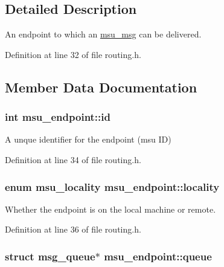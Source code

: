 \subsection{Detailed Description}
An endpoint to which an \hyperlink{structmsu__msg}{msu\-\_\-msg} can be delivered. 

Definition at line 32 of file routing.\-h.



\subsection{Member Data Documentation}
\hypertarget{structmsu__endpoint_ac80e655dbd6368c00945caf7de8e5a4b}{
\subsubsection[{id}]{\setlength{\rightskip}{0pt plus 5cm}int msu\-\_\-endpoint\-::id}}\label{structmsu__endpoint_ac80e655dbd6368c00945caf7de8e5a4b}


A unque identifier for the endpoint (msu I\-D) 



Definition at line 34 of file routing.\-h.

\hypertarget{structmsu__endpoint_aa06a2a0cc4c7ba40109635371acc8249}{
\subsubsection[{locality}]{\setlength{\rightskip}{0pt plus 5cm}enum {\bf msu\-\_\-locality} msu\-\_\-endpoint\-::locality}}\label{structmsu__endpoint_aa06a2a0cc4c7ba40109635371acc8249}


Whether the endpoint is on the local machine or remote. 



Definition at line 36 of file routing.\-h.

\hypertarget{structmsu__endpoint_af1f7b343c89039de19431c0e620916b3}{
\subsubsection[{queue}]{\setlength{\rightskip}{0pt plus 5cm}struct {\bf msg\-\_\-queue}$\ast$ msu\-\_\-endpoint\-::queue}}\label{structmsu__endpoint_af1f7b343c89039de19431c0e620916b3}


